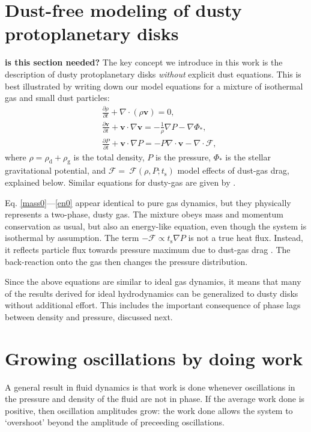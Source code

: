 \documentclass[iop, numberedappendix]{emulateapj}
\newcommand{\p}{\partial}
\newcommand{\rhod}{\rho_\mathrm{d}}
\newcommand{\rhog}{\rho_\mathrm{g}}
\newcommand{\tstop}{t_\mathrm{s}}
\begin{document}
\section{Dust-free modeling of dusty protoplanetary disks}\label{key_idea}
{\bf is this section needed?} 
The key concept we introduce in this work is the description 
of dusty protoplanetary disks \emph{without} explicit dust 
equations. This is best illustrated by writing down our model   
equations for a mixture of isothermal gas and small 
dust particles: 
\begin{align}  
  &\frac{\p \rho}{\p t} + \nabla\cdot\left(\rho\bm{v}\right)= 0, \label{mass0}\\ 
  &\frac{\p\bm{v}}{\p t} + \bm{v}\cdot\nabla\bm{v} = -
  \frac{1}{\rho}\nabla  P - \nabla \Phi_*,\label{mom0}\\ 
 & \frac{\p P}{\p t} + \bm{v}\cdot\nabla P 
  = - P \nabla\cdot\bm{v} - \nabla\cdot\bm{\mathcal{F}}
\label{en0}, 
\end{align}
where $\rho=\rhod + \rhog$ is the total density, $P$ is the pressure,
$\Phi_*$ is the stellar gravitational potential,   
and $\bm{\mathcal{F}}=~\bm{\mathcal{F}}(\rho, P; \tstop)$ model effects of dust-gas drag, explained below. 
Similar equations for dusty-gas are given by
\cite{price15}.  

Eq. \ref{mass0}---\ref{en0} appear identical to pure gas
dynamics, but they physically represents a two-phase, 
dusty gas. The mixture obeys mass and momentum conservation as usual,
but also an energy-like equation, even though the system is
isothermal by assumption. The term $-\bm{\mathcal{F}}\propto \tstop
\nabla P$ is not a true heat flux. Instead, it reflects 
particle flux towards pressure maximum due to dust-gas drag 
\citep{weidenschilling77}. The back-reaction onto the gas then changes
the pressure distribution.      




Since the above equations are similar to ideal gas dynamics, it 
means that many of the results derived for ideal hydrodynamics can be  
generalized to dusty disks without additional effort. This includes 
the important consequence of phase lags between density and pressure,
discussed next.  




\section{Growing oscillations by doing work}\label{grow_osc}
A general result in fluid dynamics is that work is done whenever
oscillations in the pressure and density of the fluid are not in
phase. If  the average work done is positive, then oscillation
amplitudes grow: the work done allows the system to `overshoot' beyond 
the amplitude of preceeding oscillations.   
\end{document}
